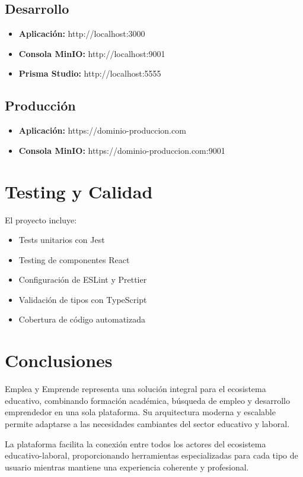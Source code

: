 \documentclass[12pt,a4paper]{article}
\begin{document}
\subsection{Desarrollo}
\begin{itemize}
    \item \textbf{Aplicación:} http://localhost:3000
    \item \textbf{Consola MinIO:} http://localhost:9001
    \item \textbf{Prisma Studio:} http://localhost:5555
\end{itemize}

\subsection{Producción}
\begin{itemize}
    \item \textbf{Aplicación:} https://dominio-produccion.com
    \item \textbf{Consola MinIO:} https://dominio-produccion.com:9001
\end{itemize}

\section{Testing y Calidad}

El proyecto incluye:

\begin{itemize}
    \item Tests unitarios con Jest
    \item Testing de componentes React
    \item Configuración de ESLint y Prettier
    \item Validación de tipos con TypeScript
    \item Cobertura de código automatizada
\end{itemize}

\section{Conclusiones}

Emplea y Emprende representa una solución integral para el ecosistema educativo, combinando formación académica, búsqueda de empleo y desarrollo emprendedor en una sola plataforma. Su arquitectura moderna y escalable permite adaptarse a las necesidades cambiantes del sector educativo y laboral.

La plataforma facilita la conexión entre todos los actores del ecosistema educativo-laboral, proporcionando herramientas especializadas para cada tipo de usuario mientras mantiene una experiencia coherente y profesional.
\end{document}
